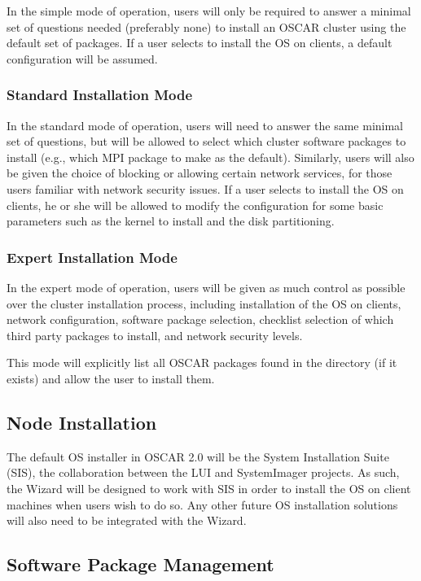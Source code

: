 In the simple mode of operation, users will only be required to answer
a minimal set of questions needed (preferably none) to install an
OSCAR cluster using the default set of packages. If a user selects to
install the OS on clients, a default configuration will be assumed.

\subsubsection{Standard Installation Mode}

In the standard mode of operation, users will need to answer the same
minimal set of questions, but will be allowed to select which cluster
software packages to install (e.g., which MPI package to make as the
default). Similarly, users will also be given the choice of blocking
or allowing certain network services, for those users familiar with
network security issues.  If a user selects to install the OS on
clients, he or she will be allowed to modify the configuration for
some basic parameters such as the kernel to install and the disk
partitioning.

\subsubsection{Expert Installation Mode}

In the expert mode of operation, users will be given as much control
as possible over the cluster installation process, including
installation of the OS on clients, network configuration, software
package selection, checklist selection of which third party packages
to install, and network security levels.

This mode will explicitly list all OSCAR packages found in the
 directory (if it exists) and allow the user to
install them.  

\subsection{Node Installation}

The default OS installer in OSCAR 2.0 will be the System Installation
Suite (SIS), the collaboration between the LUI and SystemImager
projects. As such, the Wizard will be designed to work with SIS in
order to install the OS on client machines when users wish to do so.
Any other future OS installation solutions will also need to be
integrated with the Wizard.

\subsection{Software Package Management}
\label{sec:design-software-package-mgmt}

